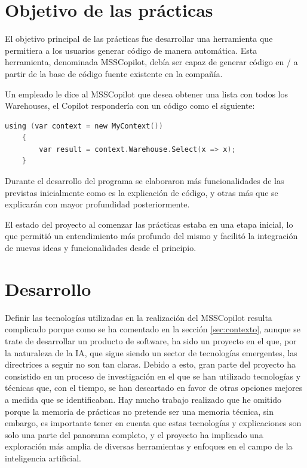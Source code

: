 

\section{Objetivo de las prácticas}
El objetivo principal de las prácticas fue desarrollar una herramienta que permitiera a los usuarios generar código de manera automática. Esta herramienta, denominada MSSCopilot, debía ser capaz de generar código en \href{https://dotnet.microsoft.com/es-es/languages/csharp}{} / \href{https://en.wikipedia.org/wiki/Language_Integrated_Query}{} a partir de la base de código fuente existente en la compañía.

\begin{examplebox}

Un empleado le dice al MSSCopilot que desea obtener una lista con todos los Warehouses, el Copilot respondería con un código como el siguiente:

\begin{lstlisting}[language=C]
    using (var context = new MyContext())
    {
        var result = context.Warehouse.Select(x => x);
    }
    \end{lstlisting}
\end{examplebox}        

Durante el desarrollo del programa se elaboraron más funcionalidades de las previstas inicialmente como es la explicación de código, y otras más que se explicarán con mayor profundidad posteriormente.

El estado del proyecto al comenzar las prácticas estaba en una etapa inicial, lo que permitió un entendimiento más profundo del mismo y facilitó la integración de nuevas ideas y funcionalidades desde el principio. 

\section{Desarrollo}

Definir las tecnologías utilizadas en la realización del MSSCopilot resulta complicado porque como se ha comentado en la sección \ref{sec:contexto}, aunque se trate de desarrollar un producto de software, ha sido un proyecto en el que, por la naturaleza de la IA, que sigue siendo un sector de tecnologías emergentes, las directrices a seguir no son tan claras. Debido a esto, gran parte del proyecto ha consistido en un proceso de investigación en el que se han utilizado tecnologías y técnicas que, con el tiempo, se han descartado en favor de otras opciones mejores a medida que se identificaban. Hay mucho trabajo realizado que he omitido porque la memoria de prácticas no pretende ser una memoria técnica, sin embargo, es importante tener en cuenta que estas tecnologías y explicaciones son solo una parte del panorama completo, y el proyecto ha implicado una exploración más amplia de diversas herramientas y enfoques en el campo de la inteligencia artificial.

